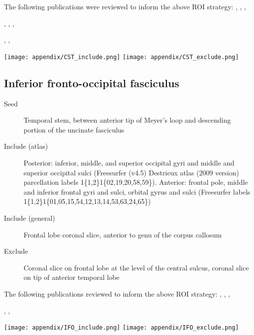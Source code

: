 \documentclass[12pt,phd,a4paper,twoside]{ucl_thesis}
\renewcommand{\textcite}[2][]{
\ifthenelse { \equal {#1} {} }  {\citeauthor{#2}\autocite{#2}}   {\citeauthor{#1}\autocite{#2}}}
\begin{document}
The following publications were reviewed to inform the above ROI strategy: \textcite{Ciccarelli2006},\textcite{Han2010},\textcite{Hattingen2009a},
\textcite{Niu2016},\textcite{Radmanesh2015},\textcite{Reich2006},
\textcite{Rosenstock2017},\textcite{Szmuda2021},\textcite{Vargas2013}

\begin{figure*}[h]
  \centering
    \texttt{[image: appendix/CST\_include.png]}
    \texttt{[image: appendix/CST\_exclude.png]}
  \caption[Corticospinal tract tractography ROIs]{Seed (yellow), inclusion (green) and exclusion (red) \glspl{roi} for the corticospinal tract}
  \label{fig:rois.cst}
\end{figure*}

\subsection{Inferior fronto-occipital fasciculus}

\begin{description}
  \item[Seed] Temporal stem, between anterior tip of Meyer's loop and descending portion of the uncinate fasciculus
  \item[Include (atlas)] Posterior: inferior, middle, and superior occipital gyri and middle and superior occipital sulci (Freesurfer (v4.5) Destrieux atlas\autocite{Destrieux2010} (2009 version) parcellation labels 1\{1,2\}1\{02,19,20,58,59\}).
  Anterior: frontal pole, middle and inferior frontal gyri and sulci, orbital gyrus and sulci (Freesurfer labels 1\{1,2\}1\{01,05,15,54,12,13,14,53,63,24,65\})
  \item[Include (general)] Frontal lobe coronal slice, anterior to genu of the corpus callosum
  \item[Exclude] Coronal slice on frontal lobe at the level of the central sulcus, coronal slice on tip of anterior temporal lobe
\end{description}

The following publications reviewed to inform the above ROI strategy: \textcite{Martino2010},\textcite{Sarubbo2013},\textcite{Hau2016},
\textcite{Catani2008},\textcite{Wakana2007},\textcite{Wu2016}

\begin{figure*}[h]
  \centering
    \texttt{[image: appendix/IFO\_include.png]}
    \texttt{[image: appendix/IFO\_exclude.png]}
  \caption[Inferior fronto-occipital fasciculus tractography ROIs]{Seed (yellow), inclusion (green) and exclusion (red) \glspl{roi} for the inferior fronto-occipital fasciculus}
  \label{fig:rois.ifo}
\end{figure*}
\end{document}

